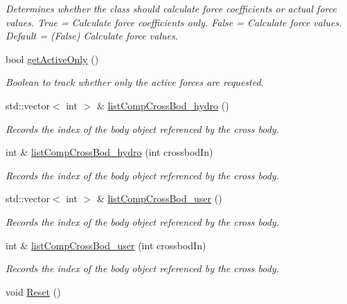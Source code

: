 \begin{DoxyCompactItemize}
\begin{DoxyCompactList}\small\item\em Determines whether the class should calculate force coefficients or actual force values. True = Calculate force coefficients only. False = Calculate force values. Default = (False) Calculate force values. \end{DoxyCompactList}\item 
bool \hyperlink{classosea_1_1ofreq_1_1_motion_model_afc54a14912e56315505ef5dbec28bd39}{get\-Active\-Only} ()
\begin{DoxyCompactList}\small\item\em Boolean to track whether only the active forces are requested. \end{DoxyCompactList}\item 
std\-::vector$<$ int $>$ \& \hyperlink{classosea_1_1ofreq_1_1_motion_model_ac4169ab37ab7d69f5030a0d67cb3dc86}{list\-Comp\-Cross\-Bod\-\_\-hydro} ()
\begin{DoxyCompactList}\small\item\em Records the index of the body object referenced by the cross body. \end{DoxyCompactList}\item 
int \& \hyperlink{classosea_1_1ofreq_1_1_motion_model_abe445279c6f964b5a64e046945249ea9}{list\-Comp\-Cross\-Bod\-\_\-hydro} (int crossbod\-In)
\begin{DoxyCompactList}\small\item\em Records the index of the body object referenced by the cross body. \end{DoxyCompactList}\item 
std\-::vector$<$ int $>$ \& \hyperlink{classosea_1_1ofreq_1_1_motion_model_a873a325f0017d73989cee1cdf8285b3c}{list\-Comp\-Cross\-Bod\-\_\-user} ()
\begin{DoxyCompactList}\small\item\em Records the index of the body object referenced by the cross body. \end{DoxyCompactList}\item 
int \& \hyperlink{classosea_1_1ofreq_1_1_motion_model_a63d9e54f8cbb434f67753fe737a89ee6}{list\-Comp\-Cross\-Bod\-\_\-user} (int crossbod\-In)
\begin{DoxyCompactList}\small\item\em Records the index of the body object referenced by the cross body. \end{DoxyCompactList}\item 
void \hyperlink{classosea_1_1ofreq_1_1_motion_model_a27842d2b76ab078534c0626601da446b}{Reset} ()

\end{DoxyCompactItemize}
